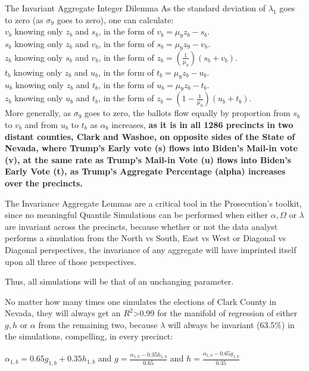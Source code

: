 \begin{corollary}{The Invariant Aggregate Integer Dilemma}
As the standard deviation of $\lambda_{1}$ goes to zero (as $\sigma_{9}$ goes to zero), one can calculate:\\
$v_{b}$ knowing only $z_{b}$ and $s_{b}$, in the form of $v_{b}=\mu_{9}z_{b}-s_{b}$.\\
$s_{b}$ knowing only $z_{b}$ and $v_{b}$, in the form of $s_{b}=\mu_{9}z_{9}-v_{b}$.\\
$z_{b}$ knowing only $s_{b}$ and $v_{b}$, in the form of $z_{b}=(\frac{1}{\mu_{9}})(s_{b}+v_{b})$.\\
$t_{b}$ knowing only $z_{b}$ and $u_{b}$, in the form of $t_{b}=\mu_{9}z_{b}-u_{b}$.\\
$u_{b}$ knowing only $z_{b}$ and $t_{b}$, in the form of $u_{b}=\mu_{9}z_{b}-t_{b}$.\\
$z_{b}$ knowing only $u_{b}$ and $t_{b}$, in the form of $z_{b}=(1-\frac{1}{\mu_{9}})(u_{b}+t_{b})$.\\
More generally, as  $\sigma_{9}$ goes to zero, the ballots flow equally by proportion from $s_{b}$ to $v_{b}$ and from $u_{b}$ to $t_{b}$ as $\alpha_{b}$ increases, \textbf{as it is in all 1286 precincts in two distant counties, Clark and Washoe, on opposite sides of the State of Nevada, where Trump's Early vote (s) flows into Biden's Mail-in vote (v), at the same rate as Trump's Mail-in Vote (u) flows into Biden's Early Vote (t), as Trump's Aggregate Percentage (alpha) increases over the precincts.}
\end{corollary}
\newpage
The Invariance Aggregate Lemmas are a critical tool in the Prosecution's toolkit, since no meaningful Quantile Simulations can be performed when either $\alpha, \Omega$ or $\lambda$  are invariant across the precincts, because whether or not the data analyst performs a simulation from the North vs South, East vs West or Diagonal vs Diagonal perspectives, the invariance of any aggregate will have imprinted itself upon all three of those perspectives.

Thus, all simulations will be that of an unchanging parameter. 

No matter how many times one simulates the elections of Clark County in Nevada, they will always get an $R^2$>0.99 for the manifold of regression of either $g,h$ or $\alpha$ from the remaining two, because $\lambda$ will always be invariant (63.5\%) in the simulations, compelling, in every precinct:

$\alpha_{1,b}=0.65g_{1,b}+0.35h_{1,b}$ and $g=\frac{\alpha_{1,b}-0.35h_{1,b}}{0.65}$ and $h=\frac{\alpha_{1,b}-0.65g_{1,b}}{0.35}$

